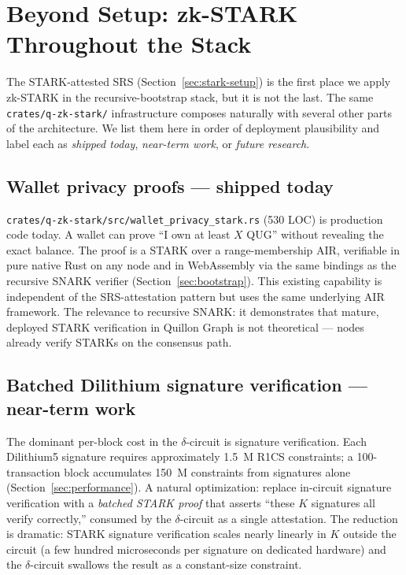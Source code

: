 \documentclass[11pt,a4paper]{article}
\begin{document}
\section{Beyond Setup: zk-STARK Throughout the Stack}
\label{sec:stark-elsewhere}

The STARK-attested SRS (Section~\ref{sec:stark-setup}) is the first place we
apply zk-STARK in the recursive-bootstrap stack, but it is not the last.
The same \texttt{crates/q-zk-stark/} infrastructure composes naturally with
several other parts of the architecture. We list them here in order of
deployment plausibility and label each as \emph{shipped today},
\emph{near-term work}, or \emph{future research}.

\subsection{Wallet privacy proofs --- shipped today}

\texttt{crates/q-zk-stark/src/wallet\_privacy\_stark.rs} (530 LOC) is
production code today. A wallet can prove ``I own at least $X$ QUG''
without revealing the exact balance. The proof is a STARK over a
range-membership AIR, verifiable in pure native Rust on any node and in
WebAssembly via the same bindings as the recursive SNARK verifier
(Section~\ref{sec:bootstrap}). This existing capability is independent of
the SRS-attestation pattern but uses the same underlying AIR framework.
The relevance to recursive SNARK: it demonstrates that mature, deployed
STARK verification in Quillon Graph is not theoretical --- nodes already
verify STARKs on the consensus path.

\subsection{Batched Dilithium signature verification --- near-term work}

The dominant per-block cost in the $\delta$-circuit is signature
verification. Each Dilithium5 signature requires approximately 1.5~M
R1CS constraints; a 100-transaction block accumulates 150~M constraints
from signatures alone (Section~\ref{sec:performance}). A natural
optimization: replace in-circuit signature verification with a
\emph{batched STARK proof} that asserts ``these $K$ signatures all
verify correctly,'' consumed by the $\delta$-circuit as a single
attestation. The reduction is dramatic: STARK signature verification
scales nearly linearly in $K$ outside the circuit (a few hundred
microseconds per signature on dedicated hardware) and the $\delta$-circuit
swallows the result as a constant-size constraint.
\end{document}
